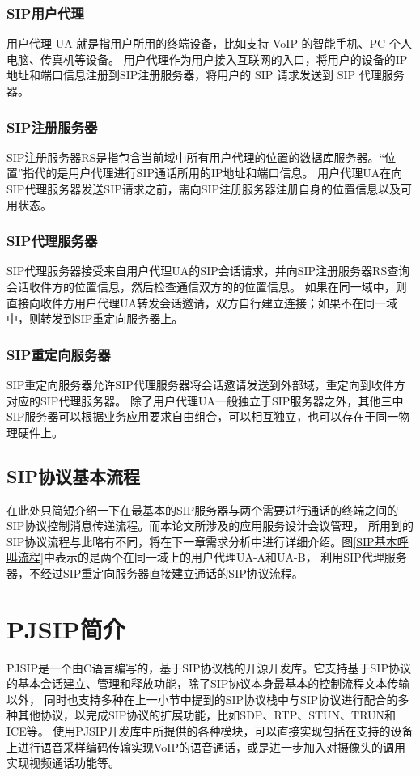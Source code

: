 \documentclass[a4paper,AutoFakeBold,oneside,12pt]{book}
\begin{document}
\subsubsection{SIP用户代理}
用户代理 UA 就是指用户所用的终端设备，比如支持 VoIP 的智能手机、PC 个人电脑、传真机等设备。
用户代理作为用户接入互联网的入口，将用户的设备的IP地址和端口信息注册到SIP注册服务器，将用户的 SIP 请求发送到 SIP 代理服务器。
\subsubsection{SIP注册服务器}
SIP注册服务器RS是指包含当前域中所有用户代理的位置的数据库服务器。“位置”指代的是用户代理进行SIP通话所用的IP地址和端口信息。
用户代理UA在向SIP代理服务器发送SIP请求之前，需向SIP注册服务器注册自身的位置信息以及可用状态。
\subsubsection{SIP代理服务器}
SIP代理服务器接受来自用户代理UA的SIP会话请求，并向SIP注册服务器RS查询会话收件方的位置信息，然后检查通信双方的的位置信息。
如果在同一域中，则直接向收件方用户代理UA转发会话邀请，双方自行建立连接；如果不在同一域中，则转发到SIP重定向服务器上。
\subsubsection{SIP重定向服务器}
SIP重定向服务器允许SIP代理服务器将会话邀请发送到外部域，重定向到收件方对应的SIP代理服务器。
\newline
除了用户代理UA一般独立于SIP服务器之外，其他三中SIP服务器可以根据业务应用要求自由组合，可以相互独立，也可以存在于同一物理硬件上。
\subsection{SIP协议基本流程}
在此处只简短介绍一下在最基本的SIP服务器与两个需要进行通话的终端之间的SIP协议控制消息传递流程。而本论文所涉及的应用服务设计会议管理，
所用到的SIP协议流程与此略有不同，将在下一章需求分析中进行详细介绍。图\ref{SIP基本呼叫流程}中表示的是两个在同一域上的用户代理UA-A和UA-B，
利用SIP代理服务器，不经过SIP重定向服务器直接建立通话的SIP协议流程。
\section{PJSIP简介}
PJSIP是一个由C语言编写的，基于SIP协议栈的开源开发库。它支持基于SIP协议的基本会话建立、管理和释放功能，除了SIP协议本身最基本的控制流程文本传输以外，
同时也支持多种在上一小节中提到的SIP协议栈中与SIP协议进行配合的多种其他协议，以完成SIP协议的扩展功能，比如SDP、RTP、STUN、TRUN和ICE等。
使用PJSIP开发库中所提供的各种模块，可以直接实现包括在支持的设备上进行语音采样编码传输实现VoIP的语音通话，或是进一步加入对摄像头的调用实现视频通话功能等。
\end{document}
